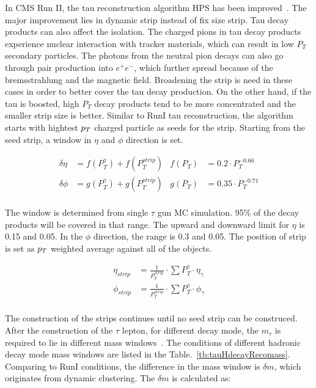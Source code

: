 In CMS Run II, the tau reconstruction algorithm HPS has been improved~\cite{TauRecoandIDRunII}. The major improvement lies in dynamic strip instead of fix size strip. Tau decay products can also affect the isolation. The charged pions in tau decay products experience nuclear interaction with tracker materials, which can result in low $P_{T}$ secondary particles. The photons from the neutral pion decays can also go through pair production into $e^{+}e^{-}$, which further spread because of the bremsstrahlung and the magnetic field. Broadening the strip is need in these cases in order to better cover the tau decay production. On the other hand, if the tau is boosted, high $P_{T}$ decay products tend to be more concentrated and the smaller strip size is better. Similar to RunI tau reconstruction, the algorithm starts with hightest $p_{T}$ charged particle as seeds for the strip. Starting from the seed strip, a window in $\eta$ and $\phi$ direction is set.  

\begin{align*}
\delta\eta&=f(P_{T}^{\gamma})+f(P_{T}^{strip})   & f(P_{T})&=0.2\cdot P_{T}^{-0.66}\\
\delta\phi&=g(P_{T}^{\gamma})+g(P_{T}^{strip}) & g(P_{T})&=0.35\cdot P_{T}^{-0.71}\\
\end{align*}

The window is determined from single $\tau$ gun MC simulation. 95\% of the decay products will be covered in that range. The upward and downward limit for $\eta$ is 0.15 and 0.05. In the $\phi$ direction, the range is 0.3 and 0.05.  The position of strip is set as $p_{T}$ weighted average against all of the objects. 

\begin{align*}
\eta_{strip}&=\frac{1}{P_{T}^{strip}}\cdot\sum P_{T}^{\gamma}\cdot\eta_{\gamma}\\
\phi_{strip}&=\frac{1}{P_{T}^{strip}}\cdot\sum P_{T}^{\gamma}\cdot\phi_{\gamma}\\
\end{align*}

The construction of the strips continues until no seed strip can be construced. After the construction of the $\tau$ lepton, for different decay mode, the $m_{\tau}$ is required to lie in different mass windows~\cite{TauReconstuction}.  The conditions of different hadronic decay mode mass windows are listed in the Table.~\ref{tb:tauHdecayRecomass}. Comparing to RunI conditions, the difference in the mass window is $\delta m$, which originates from dynamic clustering. The $\delta m$ is calculated as:

